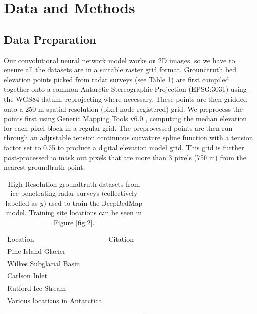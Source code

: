 \documentclass[tc, manuscript]{copernicus}
\begin{document}
\section{Data and Methods}

\subsection{Data Preparation} \label{section:datapreparation}

Our convolutional neural network model works on 2D images, so we have to ensure all the datasets are in a suitable raster grid format.
Groundtruth bed elevation points picked from radar surveys (see Table \ref{table:groundtruthdata}) are first compiled together onto a common Antarctic Stereographic Projection (EPSG:3031) using the WGS84 datum, reprojecting where necessary.
These points are then gridded onto a 250 m spatial resolution (pixel-node registered) grid.
We preprocess the points first using Generic Mapping Tools v6.0 \citep[GMT6,][]{WesselGenericMappingTools2019}, computing the median elevation for each pixel block in a regular grid.
The preprocessed points are then run through an adjustable tension continuous curvature spline function with a tension factor set to 0.35 to produce a digital elevation model grid.
This grid is further post-processed to mask out pixels that are more than 3 pixels (750 m) from the nearest groundtruth point.


\begin{table}[htbp]
  \caption{
    High Resolution groundtruth datasets from ice-penetrating radar surveys (collectively labelled as $y$) used to train the DeepBedMap model.
    Training site locations can be seen in Figure \ref{fig:2}.
  }
  \label{table:groundtruthdata}
  \begin{tabular}{lcr}
  \tophline
  Location & Citation \\
  \middlehline
  Pine Island Glacier & \cite{BinghamDiverselandscapesPine2017} \\
  Wilkes Subglacial Basin & \cite{JordanHypothesismegaoutburstflooding2010} \\
  Carlson Inlet & \cite{KingIcestreamnot2011} \\
  Rutford Ice Stream & \cite{KingSubglaciallandformsRutford2016} \\
  Various locations in Antarctica & \cite{ShiMultichannelCoherentRadar2010} \\
  \bottomhline
  \end{tabular}
  \belowtable{} %
\end{table}
\end{document}
